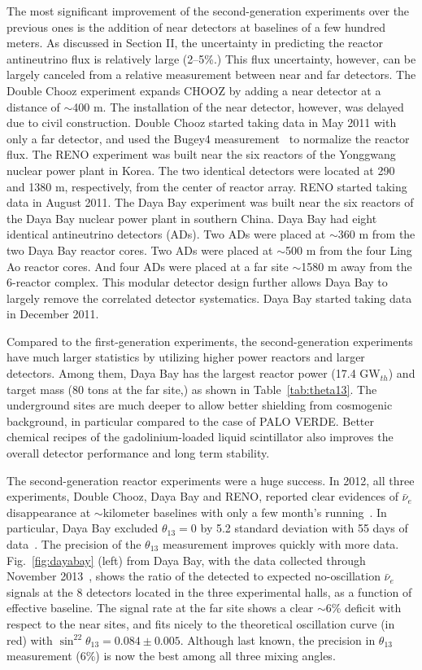 The most significant improvement of the second-generation experiments over the previous ones is the addition of near detectors at baselines of a few hundred meters. 
As discussed in Section II, the uncertainty in predicting the reactor antineutrino flux is relatively large (2--5\%.) 
This flux uncertainty, however, can be largely canceled from a relative measurement between near and far detectors. 
The Double Chooz experiment expands CHOOZ by adding a near detector at a distance of $\sim$400 m. 
The installation of the near detector, however, was delayed due to civil construction. 
Double Chooz started taking data in May 2011 with only a far detector, and used the Bugey4 measurement~\cite{Bugey4} to normalize the reactor flux. 
The RENO experiment was built near the six reactors of the Yonggwang nuclear power plant in Korea. 
The two identical detectors were located at 290 and 1380 m, respectively, from the center of reactor array. 
RENO started taking data in August 2011. 
The Daya Bay experiment was built near the six reactors of the Daya Bay nuclear power plant in southern China. 
Daya Bay had eight identical antineutrino detectors (ADs). 
Two ADs were placed at $\sim$360 m from the two  Daya Bay reactor cores. 
Two ADs were placed at $\sim$500 m from the four Ling Ao reactor cores. 
And four ADs were placed at a far site $\sim$1580 m away from the 6-reactor complex. 
This modular detector design further allows Daya Bay to largely remove the correlated detector systematics. 
Daya Bay started taking data in December 2011.

Compared to the first-generation experiments, the second-generation experiments have much larger statistics by utilizing higher power reactors and larger detectors. Among them, Daya Bay has the largest reactor power (17.4 GW$_{th}$) and target mass (80 tons at the far site,) as shown in Table~\ref{tab:theta13}. 
The underground sites are much deeper to allow better shielding from cosmogenic background, in particular compared to the case of PALO VERDE. 
Better chemical recipes of the gadolinium-loaded liquid scintillator also improves the overall detector performance and long term stability.

The second-generation reactor experiments were a huge success. 
In 2012, all three experiments, Double Chooz, Daya Bay and RENO, reported clear evidences of $\bar\nu_{e}$ disappearance at $\sim$kilometer baselines with only a few month's running~\cite{DChooz,Reno,Dayabay}. 
In particular, Daya Bay excluded $\theta_{13}=0$ by 5.2 standard deviation with 55 days of data~\cite{Dayabay}. 
The precision of the $\theta_{13}$ measurement improves quickly with more data.
Fig.~\ref{fig:dayabay} (left) from Daya Bay, with the data collected through November 2013~\cite{Zhang-Neutrino14}, shows the ratio of the detected to expected no-oscillation $\bar\nu_{e}$ signals at the 8 detectors located in the three experimental halls, as a function of effective baseline.
The signal rate at the far site shows a clear $\sim$6\% deficit with respect to the near sites, and fits nicely to the theoretical oscillation curve (in red) with $\sin^22\theta_{13} = 0.084 \pm 0.005$. 
Although last known, the precision in $\theta_{13}$ measurement (6\%) is now the best among all three mixing angles.

